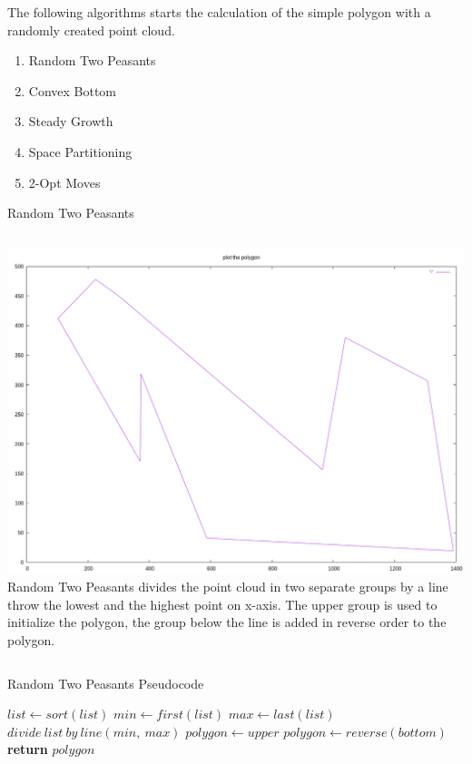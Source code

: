 \documentclass{beamer}
\begin{document}
\begin{frame}{}
  The following algorithms starts the calculation of the simple
  polygon with a randomly created point cloud.

  \begin{enumerate}
    \item Random Two Peasants
    \item Convex Bottom
    \item Steady Growth
    \item Space Partitioning
    \item 2-Opt Moves
  \end{enumerate}
\end{frame}

\begin{frame}{Random Two Peasants}
  \begin{block}{}
    \begin{columns}[onlytextwidth,T]
      \column{\dimexpr\linewidth-40mm}
      \includegraphics[width=0.5\paperwidth]{figures/kk-random-two-peasants-10-0-0.png}
      \column{40mm}
      Random Two Peasants divides the point cloud in two separate groups by a line throw
      the lowest and the highest point on x-axis. The upper group is used to
      initialize the polygon, the group below the line is added in reverse order
      to the polygon.
    \end{columns}
  \end{block}
\end{frame}

\begin{frame}{Random Two Peasants Pseudocode}
  \begin{algorithm}[H]
    \begin{algorithmic}[0]
        \State $list \gets sort(list)$
        \State $min \gets first(list)$
        \State $max \gets last(list)$
        \State $divide\ list\ by\ line(min,\ max)$
        \State $polygon \gets upper$
        \State $polygon \gets reverse(bottom)$
        \State \textbf{return} $polygon$
      \EndProcedure
    \end{algorithmic}
  \end{algorithm}
\end{frame}
\end{document}
